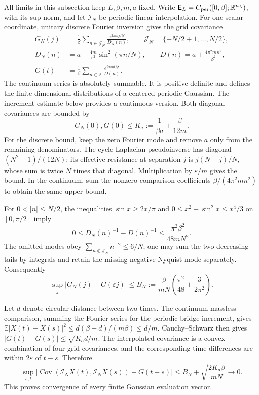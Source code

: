 \documentclass[11pt]{article}
\numberwithin{equation}{section}
\theoremstyle{definition}
\newcommand{\R}{\mathbb R}
\newcommand{\Z}{\mathbb Z}
\newcommand{\E}{\mathbb E}
\newcommand{\eps}{\varepsilon}
\begin{document}
All limits in this subsection keep $L,\beta,m,a$ fixed.  Write
$\mathsf E_L=C_{\rm per}([0,\beta];\R^{n_L})$, with its sup norm, and let
$\mathcal I_N$ be periodic linear interpolation.  For one scalar coordinate,
unitary discrete Fourier inversion gives the grid covariance
\begin{align}
 G_N(j)&=\frac1\beta\sum_{n\in\mathcal J_N}
       \frac{e^{2\pi i n j/N}}{D_N(n)},\qquad
 \mathcal J_N=\{-N/2+1,\ldots,N/2\},\nonumber\\
 D_N(n)&=a+\frac{4m}{\eps^2}\sin^2(\pi n/N),\qquad
 D(n)=a+\frac{4\pi^2mn^2}{\beta^2},\nonumber\\
 G(t)&=\frac1\beta\sum_{n\in\Z}\frac{e^{2\pi int/\beta}}{D(n)}.
 \label{eq:gaussian-covariances}
\end{align}
The continuum series is absolutely summable. It is positive definite and
defines the finite-dimensional distributions of a centered periodic Gaussian.
The increment estimate below provides a continuous version.  Both diagonal
covariances are bounded by
\begin{equation}
 G_N(0),G(0)\leq K_a:=\frac1{\beta a}+\frac\beta{12m}.
 \label{eq:gaussian-diagonal-bound}
\end{equation}
For the discrete bound, keep the zero Fourier mode and remove $a$ only from
the remaining denominators.  The cycle Laplacian pseudoinverse has diagonal
$(N^2-1)/(12N)$: its effective resistance at separation $j$ is
$j(N-j)/N$, whose sum is twice $N$ times that diagonal.  Multiplication by
$\eps/m$ gives the bound.  In the continuum, sum the nonzero comparison
coefficients $\beta/(4\pi^2mn^2)$ to obtain the same upper bound.

For $0<|n|\leq N/2$, the inequalities
$\sin x\geq2x/\pi$ and $0\leq x^2-\sin^2x\leq x^4/3$ on
$[0,\pi/2]$ imply
\[
 0\leq D_N(n)^{-1}-D(n)^{-1}
 \leq\frac{\pi^2\beta^2}{48mN^2}.
\]
The omitted modes obey $\sum_{n\notin\mathcal J_N}n^{-2}\leq6/N$;
one may sum the two decreasing tails by integrals and retain the missing
negative Nyquist mode separately. Consequently
\begin{equation}
 \sup_j|G_N(j)-G(\eps j)|
 \leq B_N:=\frac\beta{mN}
            \left(\frac{\pi^2}{48}+\frac{3}{2\pi^2}\right).
 \label{eq:gaussian-grid-error}
\end{equation}

Let $d$ denote circular distance between two times. The continuum
massless comparison, summing the Fourier series for the periodic bridge
increment, gives
$\E|X(t)-X(s)|^2\leq d(\beta-d)/(m\beta)\leq d/m$.
Cauchy--Schwarz then gives
$|G(t)-G(s)|\leq\sqrt{K_a d/m}$.
The interpolated covariance is a convex combination of four grid
covariances, and the corresponding time differences are within $2\eps$
of $t-s$.  Therefore
\begin{equation}
 \sup_{s,t}|\operatorname{Cov}(\mathcal I_NX(t),\mathcal I_NX(s))-G(t-s)|
 \leq B_N+\sqrt{\frac{2K_a\beta}{mN}}\longrightarrow0.
 \label{eq:gaussian-interpolated-error}
\end{equation}
This proves convergence of every finite Gaussian evaluation vector.
\end{document}
